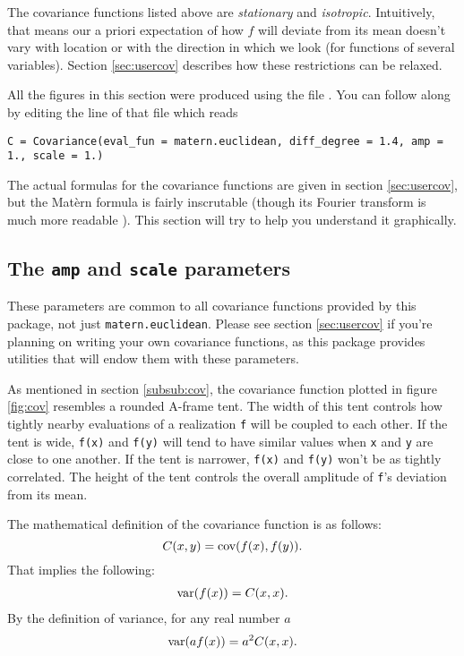 \documentclass{manual}
\begin{document}
The covariance functions listed above are \emph{stationary} and \emph{isotropic}. Intuitively, that means our a priori expectation of how $f$ will deviate from its mean doesn't vary with location or with the direction in which we look (for functions of several variables). Section \ref{sec:usercov} describes how these restrictions can be relaxed.

All the figures in this section were produced using the file . You can follow along by editing the line of that file which reads
\begin{verbatim}
C = Covariance(eval_fun = matern.euclidean, diff_degree = 1.4, amp = 1., scale = 1.)
\end{verbatim}

The actual formulas for the covariance functions are given in section \ref{sec:usercov}, but the Mat\`ern formula is fairly inscrutable (though its Fourier transform is much more readable \cite{stein}). This section will try to help you understand it graphically.

\subsection*{The \texttt{amp} and \texttt{scale} parameters}\label{sub:ampscale}

These parameters are common to all covariance functions provided by this package, not just \texttt{matern.euclidean}. Please see section \ref{sec:usercov} if you're planning on writing your own covariance functions, as this package provides utilities that will endow them with these parameters.

As mentioned in section \ref{subsub:cov}, the covariance function plotted in figure \ref{fig:cov} resembles a rounded A-frame tent. The width of this tent controls how tightly nearby evaluations of a realization \texttt{f} will be coupled to each other. If the tent is wide, \texttt{f(x)} and \texttt{f(y)} will tend to have similar values when \texttt{x} and \texttt{y} are close to one another. If the tent is narrower, \texttt{f(x)} and \texttt{f(y)} won't be as tightly correlated. The height of the tent controls the overall amplitude of \texttt{f}'s deviation from its mean.

The mathematical definition of the covariance function is as follows:
\begin{equation}
    \label{covdef} 
    C(x,y)=\textup{cov}(f(x), f(y)).
\end{equation}
That implies the following:
\begin{eqnarray*}
    \textup{var}(f(x))=C(x,x).
\end{eqnarray*}
By the definition of variance, for any real number $a$
\begin{eqnarray*}
    \textup{var}( a f(x))=a^2 C(x,x).
\end{eqnarray*}
\end{document}
